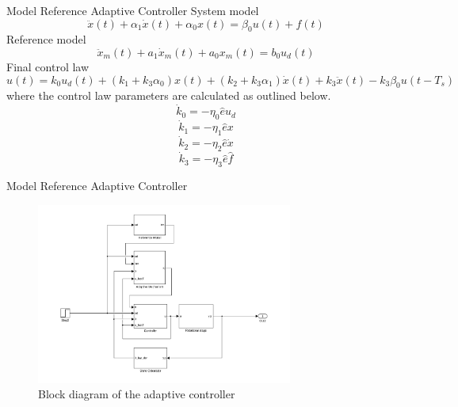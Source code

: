\documentclass[10pt]{beamer}
\begin{document}
\begin{frame}{Model Reference Adaptive Controller}
  System model
    \begin{equation*}
      \label{eq:sysmodel}
      \ddot{x}(t) + \alpha_1\dot{x}(t) +  \alpha_0x(t) = \beta_0u(t) + f(t)
    \end{equation*}
  Reference model
    \begin{equation*}
      \label{eq:refmodel}
      \ddot{x}_m(t) + a_1\dot{x}_m(t) +  a_0x_m(t) = b_0u_d(t)
    \end{equation*}
  Final control law
    \begin{equation*}
        \label{eq:adaplawsfinal}
      u(t) = k_0u_d(t) + (k_1 + k_3\alpha_0)x(t) +  (k_2 + k_3\alpha_1)\dot{x}(t) + k_3\ddot{x}(t) - k_3\beta_0u(t-T_s)
    \end{equation*}
    where the control law parameters are calculated as outlined below.
    \begin{equation*}
      \label{eq:adaplaws1}
      \dot{k}_0 = -\eta_0\hat{e}u_d
    \end{equation*}
    \begin{equation*}
      \label{eq:adaplaws2}
      \dot{k}_1 = -\eta_1\hat{e}x
    \end{equation*}
    \begin{equation*}
      \label{eq:adaplaws3}
      \dot{k}_2 = -\eta_2\hat{e}\dot{x}
    \end{equation*}
    \begin{equation*}
      \label{eq:adaplaws4}
      \dot{k}_3 = -\eta_3\hat{e}\hat{f}
    \end{equation*}
\end{frame}

\begin{frame}{Model Reference Adaptive Controller}
  \begin{figure}[h]
    \centering %
    \includegraphics[width=0.75\textwidth, trim=5cm 0cm 3.8cm 0cm, clip=true]{../fig/matlab/adaptive_scheme}
    \caption{\label{fig:adaptive}Block diagram of the adaptive controller}
  \end{figure}
\end{frame}
\end{document}
